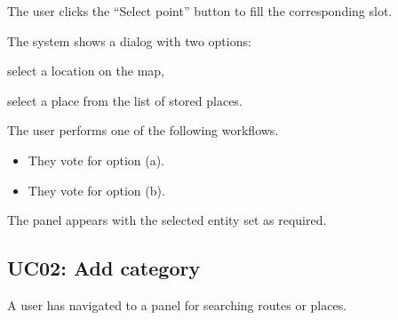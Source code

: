 \begin{ucenumerate}
\item The user clicks the ``Select point'' button to fill the corresponding slot.
\item The system shows a dialog with two options:
\begin{ucenumerate}
\item select a location on the map,
\item select a place from the list of stored places.
\end{ucenumerate}
\item The user performs one of the following workflows.
\begin{itemize}
\item They vote for option (a).
\item They vote for option (b).
\end{itemize}
\end{ucenumerate}


\begin{ucitemize}
\item The panel appears with the selected entity set as required.
\end{ucitemize}

\subsection{UC02: Add category}\label{sssec:uc-add-category}


\begin{ucitemize}
\item A user has navigated to a panel for searching routes or places.
\end{ucitemize}

